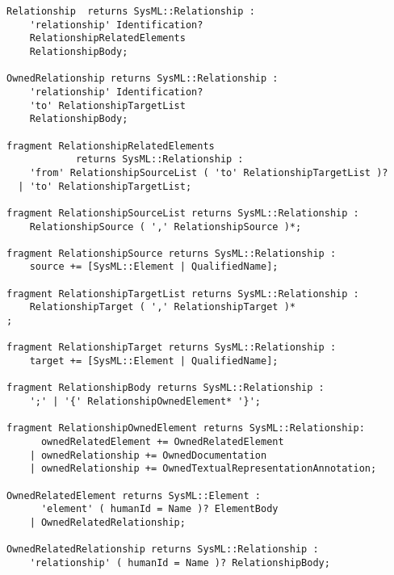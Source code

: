 
\begin{center}
\begin{lstlisting}[caption={Confidence and evidences for trustable traceability},label=lst:relationship,style=mystylextext,frame=shadowbox, rulesepcolor=\color{blue}]
Relationship  returns SysML::Relationship :
    'relationship' Identification?
    RelationshipRelatedElements
    RelationshipBody;

OwnedRelationship returns SysML::Relationship :
    'relationship' Identification?
    'to' RelationshipTargetList
    RelationshipBody;

fragment RelationshipRelatedElements 
            returns SysML::Relationship :
    'from' RelationshipSourceList ( 'to' RelationshipTargetList )?
  | 'to' RelationshipTargetList;

fragment RelationshipSourceList returns SysML::Relationship :
    RelationshipSource ( ',' RelationshipSource )*;

fragment RelationshipSource returns SysML::Relationship :
    source += [SysML::Element | QualifiedName];

fragment RelationshipTargetList returns SysML::Relationship :
    RelationshipTarget ( ',' RelationshipTarget )*
;

fragment RelationshipTarget returns SysML::Relationship :
    target += [SysML::Element | QualifiedName];

fragment RelationshipBody returns SysML::Relationship :
    ';' | '{' RelationshipOwnedElement* '}';

fragment RelationshipOwnedElement returns SysML::Relationship:
      ownedRelatedElement += OwnedRelatedElement
    | ownedRelationship += OwnedDocumentation
    | ownedRelationship += OwnedTextualRepresentationAnnotation;

OwnedRelatedElement returns SysML::Element :
      'element' ( humanId = Name )? ElementBody
    | OwnedRelatedRelationship;

OwnedRelatedRelationship returns SysML::Relationship :
    'relationship' ( humanId = Name )? RelationshipBody;
\end{lstlisting}
\end{center}